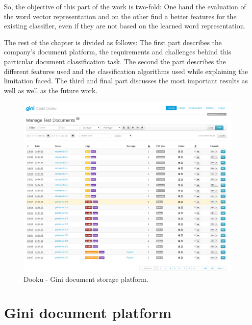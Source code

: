 So, the objective of this part of the work is two-fold:  One  hand the
evaluation of the word vector representation and on the other find a better
features for the existing classifier, even if they are not based on the
learned word representation.

The rest of the chapter is divided as follows: The first part describes 
the company's  document platform, the requirements and challenges behind this
particular document classification task. The second the part describes the different features
used and the classification algorithms used while explaining the limitation
faced.  The third and final  part discusses the most important results as
well as well as the future work. 

\begin{figure}[h]
    \centering
    \includegraphics[width=\textwidth]{images/001-dooku-screenshot.png}
    \caption{Dooku - Gini document storage platform.}
    \label{fig:dooku_screenshot}
\end{figure}

\section{Gini document platform}
\label{sec:gini_doc_platform}

